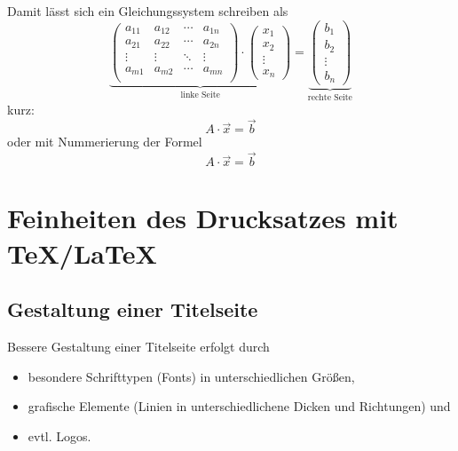 \documentclass[ngerman,               %
               a4paper,               %
               fleqn,                 %
                     ]{scrartcl}       %
\begin{document}
Damit lässt sich ein Gleichungssystem schreiben als
\[
    \underbrace{
      \left(
          \begin{array}{*{4}{c}}
            a_{11} & a_{12} & \cdots & a_{1n} \\
            a_{21} & a_{22} & \cdots & a_{2n} \\
            \vdots & \vdots & \ddots & \vdots \\
            a_{m1} & a_{m2} & \cdots & a_{mn} \\
          \end{array}
      \right)
      \cdot
      \left(
          \begin{array}{c}
            x_{1} \\
            x_{2} \\
            \vdots \\
            x_{n}
          \end{array}
      \right)
    }_{\text{linke Seite}}
    =
    \underbrace{
      \left(
          \begin{array}{c}
            b_{1} \\
            b_{2} \\
            \vdots \\
            b_{n}
          \end{array}
      \right)
    }_{\text{rechte Seite}}
\]
kurz:
\[
    A\cdot\vec{x}=\vec{b}
\]
oder mit Nummerierung der Formel
\begin{equation}
    A\cdot\vec{x}=\vec{b}
\end{equation}


\section{Feinheiten des Drucksatzes mit \TeX/\LaTeX}

\subsection{Gestaltung einer Titelseite}

Bessere Gestaltung einer Titelseite erfolgt durch
\begin{itemize}
  \item besondere Schrifttypen (Fonts) in unterschiedlichen Größen,
  \item grafische Elemente (Linien in unterschiedlichene Dicken und
    Richtungen) und
  \item evtl. Logos.
\end{itemize}
\end{document}
